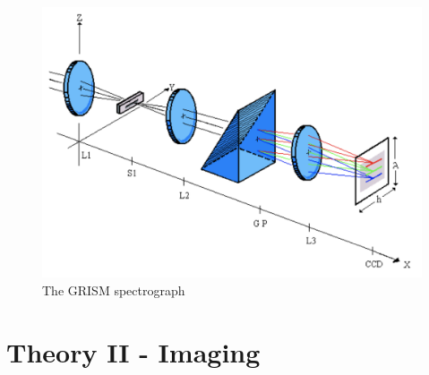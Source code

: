 \begin{figure}[H]
    \centering
    \includegraphics[width = 12cm]{Images/theory/grismspec.png}
    \caption{The GRISM spectrograph}
    \label{fig:grismspec}
\end{figure}


\chapter{Theory II - Imaging} %
\label{chap:theory2}


